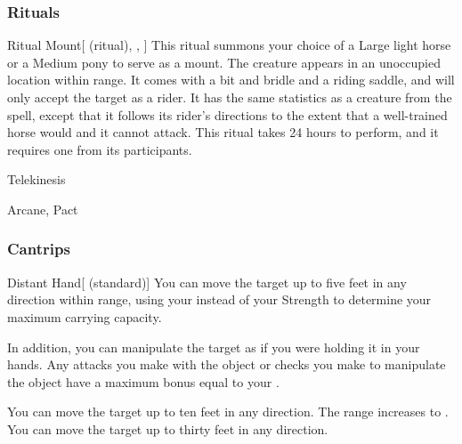 \subsubsection{Rituals}


\lowercase{\hypertarget{spell:Ritual Mount}{}}\label{spell:Ritual Mount}
\begin{attuneability}[Rank 3]{\hypertarget{spell:Ritual Mount}{Ritual Mount}}[ (ritual), , ]
This ritual summons your choice of a Large light horse or a Medium pony to serve as a mount.
The creature appears in an unoccupied location within \rngmed range.
It comes with a bit and bridle and a riding saddle, and will only accept the target as a rider.
It has the same statistics as a creature from the  spell, except that it follows its rider's directions to the extent that a well-trained horse would and it cannot attack.
This ritual takes 24 hours to perform, and it requires one  from its participants.
\end{attuneability}
\vspace{0.25em}


\newpage
\begin{spellsection}{Telekinesis}

\begin{spellheader}
\end{spellheader}


 Arcane, Pact

\subsubsection{Cantrips}


\begin{freeability}{Distant Hand}[ (standard)]
You can move the target up to five feet in any direction within range, using your  instead of your Strength to determine your maximum carrying capacity.

In addition, you can manipulate the target as if you were holding it in your hands.
Any attacks you make with the object or checks you make to manipulate the object have a maximum bonus equal to your .

\rankline
{} You can move the target up to ten feet in any direction.
 The range increases to \rngmed.
 You can move the target up to thirty feet in any direction.
\end{freeability}

\end{spellsection}


